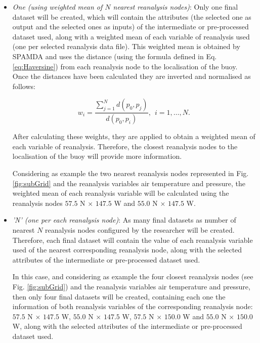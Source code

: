 \begin{onehalfspace}
\begin{itemize}
\begin{itemize}
							\item \textit{One (using weighted mean of $N$ nearest reanalysis nodes)}: Only one final dataset will be created, which will contain the attributes (the selected one as output and the selected ones as inputs) of the intermediate or pre-processed dataset used, along with a weighted mean of each variable of reanalysis used (one per selected reanalysis data file). This weighted mean is obtained by SPAMDA and uses the distance (using the formula defined in Eq. \ref{eq:Haversine}) from each reanalysis node to the localisation of the buoy. Once the distances have been calculated they are inverted and normalised as follows:
							
								\begin{linenomath*}
									\begin{equation}
										w_i=\frac{\sum_{j=1}^{N} d(p_0,p_j)}{d(p_0,p_i)}, ~~i=1, \ldots, N.
										\label{eq:weightedMean}
									\end{equation}
								\end{linenomath*}
							
							After calculating these weights, they are applied to obtain a weighted mean of each variable of reanalysis. Therefore, the closest reanalysis nodes to the localisation of the buoy will provide more information.
							
							Considering as example the two nearest reanalysis nodes represented in Fig. \ref{fig:subGrid} and the reanalysis variables air temperature and pressure, the weighted mean of each reanalysis variable will be calculated using the reanalysis nodes $57.5$ N $\times$ $147.5$ W and $55.0$ N $\times$ $147.5$ W.
							
							\item \textit{'N' (one per each reanalysis node)}: As many final datasets as number of nearest $N$ reanalysis nodes configured by the researcher will be created. Therefore, each final dataset will contain the value of each reanalysis variable used of the nearest corresponding reanalysis node, along with the selected attributes of the intermediate or pre-processed dataset used.
							
							In this case, and considering as example the four closest reanalysis nodes (see Fig. \ref{fig:subGrid}) and the reanalysis variables air temperature and pressure, then only four final datasets will be created, containing each one the information of both reanalysis variables of the corresponding reanalysis node: $57.5$ N $\times$ $147.5$ W, $55.0$ N $\times$ $147.5$ W, $57.5$ N $\times$ $150.0$ W and $55.0$ N $\times$ $150.0$ W, along with the selected attributes of the intermediate or pre-processed dataset used.
							

\end{itemize}
\end{itemize}
\end{onehalfspace}
